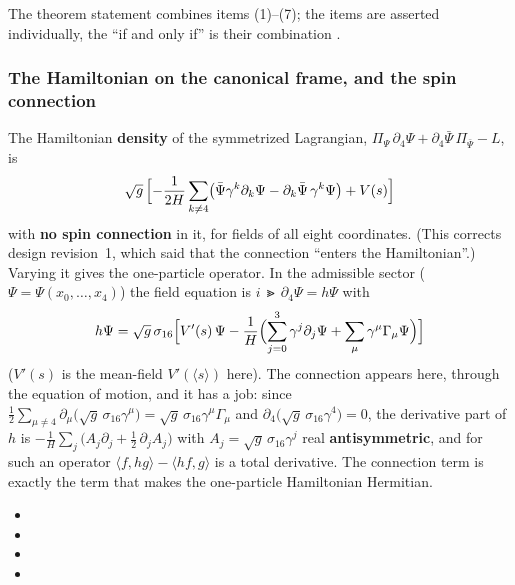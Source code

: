 The theorem statement combines items (1)--(7); the items are asserted individually, the ``if and
only if'' is their combination .

\subsubsection{The Hamiltonian on the canonical frame, and the spin connection}
\label{sec:3.5.11}

The Hamiltonian \textbf{density} of the symmetrized Lagrangian,
$\Pi_\Psi\,\partial_4\Psi+\partial_4\bar\Psi\,\Pi_{\bar\Psi}-L$, is
\[
  \sqrt g\,\Bigl[-\frac{1}{2H}\sum_{k\neq4}\bigl(\bar\Psi\gamma^k\partial_k\Psi-\partial_k\bar\Psi\,\gamma^k\Psi\bigr)+V(s)\Bigr]
\]
with \textbf{no spin connection} in it, for fields of all eight coordinates. (This corrects design
revision~1, which said that the connection ``enters the Hamiltonian''.) Varying it gives the
one-particle operator. In the admissible sector ($\Psi=\Psi(x_0,\dots,x_4)$) the field equation is
$i\,\Gt\,\partial_4\Psi=h\Psi$ with
\[
  h\Psi=\sqrt g\,\sigma_{16}\Bigl[V'(s)\,\Psi-\frac1H\Bigl(\sum_{j=0}^{3}\gamma^j\partial_j\Psi+\sum_\mu\gamma^\mu\Gamma_\mu\Psi\Bigr)\Bigr]
\]
($V'(s)$ is the mean-field $V'(\langle s\rangle)$ here). The connection appears here, through the
equation of motion, and it has a job: since
$\tfrac12\sum_{\mu\neq4}\partial_\mu\bigl(\sqrt g\,\sigma_{16}\gamma^\mu\bigr)=\sqrt g\,\sigma_{16}\gamma^\mu\Gamma_\mu$
and $\partial_4\bigl(\sqrt g\,\sigma_{16}\gamma^4\bigr)=0$, the derivative part of $h$ is
$-\frac1H\sum_j\bigl(A_j\partial_j+\tfrac12\,\partial_jA_j\bigr)$ with $A_j=\sqrt g\,\sigma_{16}\gamma^j$
real \textbf{antisymmetric}, and for such an operator $\langle f,hg\rangle-\langle hf,g\rangle$ is a
total derivative. The connection term is exactly the term that makes the one-particle Hamiltonian
Hermitian. 
\begin{itemize}
  \item {}
  \item {}
  \item {}
  \item {}
\end{itemize}

